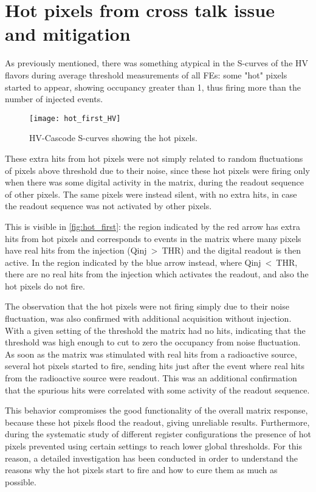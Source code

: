 \section{Hot pixels from cross talk issue and mitigation} \label{sec:xtalk}

As previously mentioned, there was something atypical in the S-curves of the HV flavors during average threshold measurements of all FEs: some "hot" pixels started to appear, showing occupancy greater than 1, thus firing more than the number of injected events. 

\begin{figure}[h!]
\centering
\texttt{[image: hot\_first\_HV]}
\caption{HV-Cascode S-curves showing the hot pixels.}
\label{fig:hot_first}
\end{figure}

These extra hits from hot pixels were not simply related to random fluctuations of pixels above threshold due to their noise, since these hot pixels were firing only when there was some digital activity in the matrix, during the readout sequence of other pixels. The same pixels were instead silent, with no extra hits, in case the readout sequence was not activated by other pixels. 

This is visible in \autoref{fig:hot_first}: the region indicated by the red arrow has extra hits from hot pixels and corresponds to events in the matrix where many pixels have real hits from the injection (Qinj~>~THR) and the digital readout is then active. In the region indicated by the blue arrow instead, where Qinj~<~THR, there are no real hits from the injection which activates the readout, and also the hot pixels do not fire.  

The observation that the hot pixels were not firing simply due to their noise fluctuation, was also confirmed with additional acquisition without injection. With a given setting of the threshold the matrix had no hits, indicating that the threshold was high enough to cut to zero the occupancy from noise fluctuation. As soon as the matrix was stimulated with real hits from a radioactive source, several hot pixels started to fire, sending hits just after the event where real hits from the radioactive source were readout. This was an additional confirmation that the spurious hits were correlated with some activity of the readout sequence. 


This behavior compromises the good functionality of the overall matrix response, because these hot pixels flood the readout, giving unreliable results. Furthermore, during the systematic study of different register configurations the presence of hot pixels prevented using certain settings to reach lower global thresholds. For this reason, a detailed investigation has been conducted in order to understand the reasons why the hot pixels start to fire and how to cure them as much as possible.\\ 


